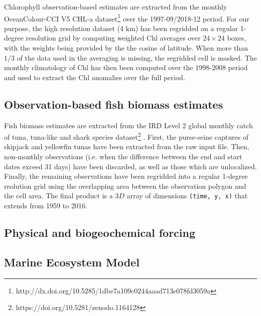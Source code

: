 Chlorophyll observation-based estimates are extracted from the monthly OceanColour-CCI V5 CHL-a dataset\footnote{http://dx.doi.org/10.5285/1dbe7a109c0244aaad713e078fd3059a}  \citep{sathyendranathOceanColourTimeSeries2019} over the 1997-09/2018-12 period. For our purpose, the high resolution dataset (4 km) has been regridded on a regular 1-degree resolution grid by computing weighted Chl averages over $24\times24$ boxes, with the weights being provided by the the cosine of latitude. When more than $1/3$ of the data used in the averaging is missing, the regridded cell is masked. The monthly climatology of Chl has then been computed over the 1998-2008 period and used to extract the Chl anomalies over the full period.

\subsection{Observation-based fish biomass estimates}

Fish biomass estimates are extracted from the IRD Level 2 global monthly catch of tuna, tuna-like and shark species dataset\footnote{https://doi.org/10.5281/zenodo.1164128} \citep{taconetGlobalMonthlyCatch2018}. First, the purse-seine captures of skipjack and yellowfin tunas have been extracted from the raw input file. Then, non-monthly observations (i.e. when the difference between the end and start dates exceed 31 days) have been discarded, as well as those which are unlocalized. Finally, the remaining observations have been regridded into a regular 1-degree reolution grid using the overlapping area between the observation polygon and the cell area. The final product is a $3D$ array of dimensions \verb+(time, y, x)+ that extends from 1959 to 2016.

\subsection{Physical and biogeochemical forcing}


\subsection{Marine Ecosystem Model}

